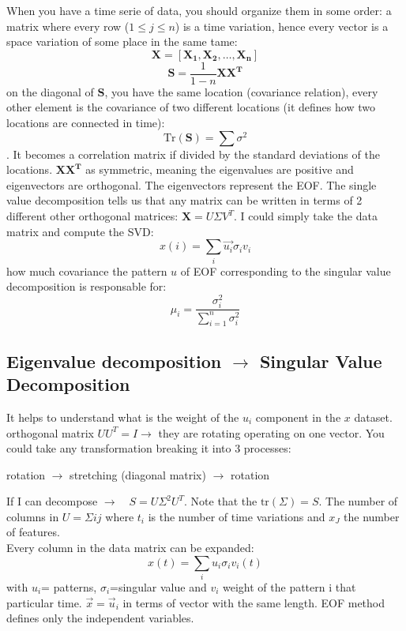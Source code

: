 When you have a time serie of data, you should organize them in some order: a matrix where every row ($1\leq j\leq n$) is a time variation, hence every vector is a space variation of some place in the same tame:
$$\mathbf{X}=\left[\mathbf{X_1, X_2,\dots, X_n} \right]$$
$$\mathbf{S}=\frac{1}
	{1-n}\mathbf{X}\mathbf{X^T}$$
on the diagonal of $\mathbf{S}$, you have the same location (covariance relation), every other element is the covariance of two different locations (it defines how two locations are connected in time): $$\text{Tr}(\mathbf{S})=\sum\sigma^2$$. It becomes a correlation matrix if divided by the standard deviations of the locations. $\mathbf{XX^T}$ as symmetric, meaning the eigenvalues are positive and eigenvectors are orthogonal. The eigenvectors represent the EOF. The single value decomposition tells us that any matrix can be written in terms of 2 different other orthogonal matrices: $\mathbf{X}=U\Sigma V^T$. I could simply take the data matrix and compute the SVD:
$$x(i)=\sum_i\vec{u_i}\sigma_iv_i$$
how much covariance the pattern $u$ of EOF corresponding to the singular value decomposition  is responsable for:
$$\mu_i=\frac{\sigma_i^2}{\displaystyle\sum_{i=1}^{n}\sigma_i^2}$$
\subsection{Eigenvalue decomposition $\rightarrow$ Singular Value Decomposition}
It helps to understand what is the weight of the $u_i$ component in the $x$ dataset.
\\


orthogonal matrix $UU^T=I\rightarrow$ they are rotating operating on one vector. You could take any transformation breaking it into 3 processes:
\begin{center}
	rotation $\rightarrow$ stretching (diagonal matrix) $\rightarrow$ rotation
\end{center}
If I can decompose $\rightarrow \quad S=U\Sigma^2U^T$. Note that the $\text{tr}(\Sigma)=S$. The number of columns in $U=\Sigma ij$ where $t_i$ is the number of time variations and $x_J$ the number of features.
\\


Every column in the data matrix can be expanded:
\begin{equation*}
	x(t)=\sum_iu_i\sigma_iv_i(t)
\end{equation*}
with $u_i$= patterns, $\sigma_i$=singular value and $v_i$ weight of the pattern i that particular time. $\vec{x}=\vec{u}_i$ in terms of vector with the same length. EOF method defines only the independent variables.

